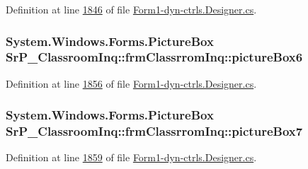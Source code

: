 \-Definition at line \hyperlink{_form1-dyn-ctrls_8_designer_8cs_source_l01846}{1846} of file \hyperlink{_form1-dyn-ctrls_8_designer_8cs_source}{\-Form1-\/dyn-\/ctrls.\-Designer.\-cs}.

\hypertarget{class_sr_p___classroom_inq_1_1frm_classrrom_inq_a1431b950ca4cfb27ea99f44116fa80da}{
\subsubsection[{picture\-Box6}]{\setlength{\rightskip}{0pt plus 5cm}\-System.\-Windows.\-Forms.\-Picture\-Box {\bf \-Sr\-P\-\_\-\-Classroom\-Inq\-::frm\-Classrrom\-Inq\-::picture\-Box6}}}
\label{class_sr_p___classroom_inq_1_1frm_classrrom_inq_a1431b950ca4cfb27ea99f44116fa80da}


\-Definition at line \hyperlink{_form1-dyn-ctrls_8_designer_8cs_source_l01856}{1856} of file \hyperlink{_form1-dyn-ctrls_8_designer_8cs_source}{\-Form1-\/dyn-\/ctrls.\-Designer.\-cs}.

\hypertarget{class_sr_p___classroom_inq_1_1frm_classrrom_inq_a48b90a7203524b9da0e6bcba8ea1ba6e}{
\subsubsection[{picture\-Box7}]{\setlength{\rightskip}{0pt plus 5cm}\-System.\-Windows.\-Forms.\-Picture\-Box {\bf \-Sr\-P\-\_\-\-Classroom\-Inq\-::frm\-Classrrom\-Inq\-::picture\-Box7}}}
\label{class_sr_p___classroom_inq_1_1frm_classrrom_inq_a48b90a7203524b9da0e6bcba8ea1ba6e}


\-Definition at line \hyperlink{_form1-dyn-ctrls_8_designer_8cs_source_l01859}{1859} of file \hyperlink{_form1-dyn-ctrls_8_designer_8cs_source}{\-Form1-\/dyn-\/ctrls.\-Designer.\-cs}.

